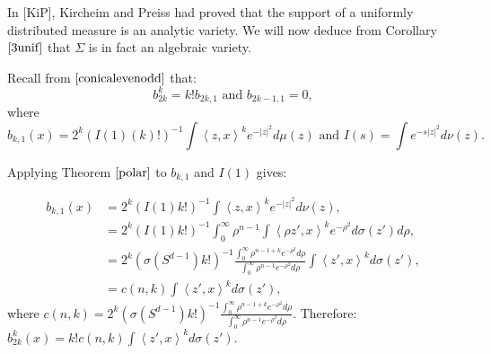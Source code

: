 \documentclass[11pt]{article}
\theoremstyle{definition}
\theoremstyle{remark}
\numberwithin{equation}{section}
\begin{document}
                                                   
                                                                                                                                     
In [KiP], Kircheim and Preiss had proved that the support of a uniformly distributed measure is an analytic variety. We will now deduce from Corollary $\ref{3unif}$ that $\Sigma$ is in fact an algebraic variety. 

Recall from $\eqref{conicalevenodd}$ that: 
$$
b_{2k}^{k} = k! b_{2k,1} \mbox{ and } b_{2k-1,1}=0,
$$
 where $$ b_{k,1}(x)= 2^{k}(I(1) (k)!)^{-1} \int \left\langle z, x \right\rangle^{k} e^{-|z|^{2}} d\mu(z) \mbox{ and } I(s)= \int e^{-s|z|^2} d\nu(z).$$

 Applying Theorem $\ref{polar}$ to $b_{k,1}$ and $I(1)$ gives:
 
 \begin{align*}
 b_{k,1}(x)& = 2^{k}(I(1) k!)^{-1} \int \left\langle z, x \right\rangle^{k} e^{-|z|^{2}} d\nu(z),\\
 &= 2^{k}(I(1) k!)^{-1}  \int_{0}^{\infty} {\rho}^{n-1} \int \left\langle \rho z' , x \right\rangle^{k} e^{-{\rho}^{2}} d\sigma(z') d\rho, \\
 &= 2^{k}(\sigma(S^{d-1})k!)^{-1}  \frac{\int_{0}^{\infty} {\rho}^{n-1+k} e^{-{\rho}^2} d\rho}{\int_{0}^{\infty} {\rho}^{n-1} e^{-{\rho}^2} d\rho} \int \left\langle  z' , x \right\rangle^{k}  d\sigma(z'), \\
   &=c(n,k)  \int \left\langle  z' , x \right\rangle^{k}  d\sigma(z'),    
 \end{align*}
 where $c(n,k)=2^{k}(\sigma(S^{d-1})k!)^{-1}  \frac{\int_{0}^{\infty} {\rho}^{n-1+k} e^{-{\rho}^2} d\rho}{\int_{0}^{\infty} {\rho}^{n-1} e^{-{\rho}^2} d\rho}$.
 Therefore: $b_{2k}^{k}(x) = k! c(n,k) \int \left\langle  z' , x \right\rangle^{k}  d\sigma(z')$.
 
\end{document}
